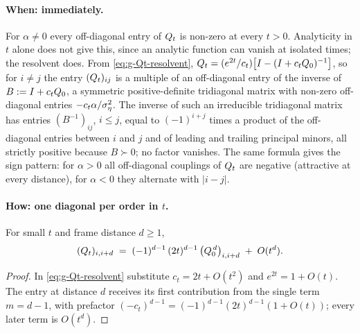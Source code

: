 \paragraph{When: immediately.} For $\alpha \ne 0$ every off-diagonal entry of
$Q_t$ is non-zero at every $t > 0$. Analyticity in $t$ alone does not give
this, since an analytic function can vanish at isolated times; the resolvent
does. From \eqref{eq:g-Qt-resolvent},
$Q_t = (e^{2t}/c_t)\big[I - (I + c_tQ_0)^{-1}\big]$, so for $i \ne j$ the
entry $(Q_t)_{ij}$ is a multiple of an off-diagonal entry of the inverse of
$B := I + c_tQ_0$, a symmetric positive-definite tridiagonal matrix with
non-zero off-diagonal entries $-c_t\alpha/\sigma_\eta^2$. The inverse of such an
irreducible tridiagonal matrix has entries $(B^{-1})_{ij}$, $i \le j$, equal
to $(-1)^{i+j}$ times a product of the off-diagonal entries between $i$ and
$j$ and of leading and trailing principal minors, all strictly positive
because $B \succ 0$; no factor vanishes. The same formula gives the sign
pattern: for $\alpha > 0$ all off-diagonal couplings of $Q_t$ are negative
(attractive at every distance), for $\alpha < 0$ they alternate with
$|i-j|$.

\paragraph{How: one diagonal per order in $t$.}

\begin{theorem}\label{thm:g-bandfill}
For small $t$ and frame distance $d \ge 1$,
\begin{equation}
  (Q_t)_{i, i+d}
  \;=\; (-1)^{d-1}\, (2t)^{d-1}\, \big( Q_0^{\,d} \big)_{i, i+d}
  \;+\; O(t^{d}) .
  \label{eq:g-bandfill}
\end{equation}
\end{theorem}

\begin{proof}
In \eqref{eq:g-Qt-resolvent} substitute $c_t = 2t + O(t^2)$ and
$e^{2t} = 1 + O(t)$. The entry at distance $d$ receives its first
contribution from the single term $m = d-1$, with prefactor
$(-c_t)^{d-1} = (-1)^{d-1}(2t)^{d-1}(1 + O(t))$; every later term is
$O(t^{d})$.
\end{proof}

